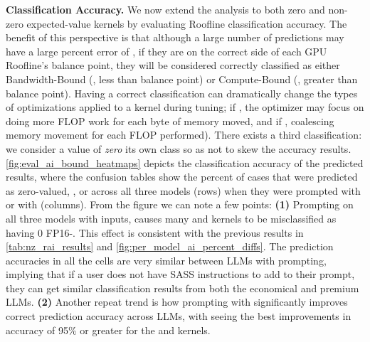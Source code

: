 
\textbf{\rai Classification Accuracy.}
We now extend the analysis to both zero and non-zero expected-value \rai kernels by evaluating Roofline classification accuracy.
The benefit of this perspective is that although a large number of \rai predictions may have a large percent error of \pmfifty, if they are on the correct side of each GPU Roofline's balance point, they will be considered correctly classified as either Bandwidth-Bound (\bandbound, less than balance point) or Compute-Bound (\compbound, greater than balance point).
Having a correct classification can dramatically change the types of optimizations applied to a kernel during tuning; if \compbound, the optimizer may focus on doing more FLOP work for each byte of memory moved, and if \bandbound, coalescing memory movement for each FLOP performed).
There exists a third \rai classification: we consider a \rai value of \textit{zero} its own class so as not to skew the \bandbound accuracy results.
\autoref{fig:eval_ai_bound_heatmaps} depicts the classification accuracy of the predicted \rai results, where the confusion tables show the percent of cases that were predicted as zero-valued, \bandbound, or \compbound across all three models (rows) when they were prompted with \sourceonly or with \sourceSASS (columns). 
From the figure we can note a few points:
\textbf{(1)} Prompting on all three models with \sourceonly inputs, causes many \bandbound and \compbound kernels to be misclassified as having 0 FP16-\rai. 
This effect is consistent with the previous results in \autoref{tab:nz_rai_results} and \autoref{fig:per_model_ai_percent_diffs}.
The prediction accuracies in all the cells are very similar between LLMs with \sourceonly prompting, implying that if a user does not have SASS instructions to add to their prompt, they can get similar \rai classification results from both the economical and premium LLMs.
\textbf{(2)} Another repeat trend is how prompting with \sourceSASS significantly improves correct prediction accuracy across LLMs, with \opus seeing the best improvements in accuracy of 95\% or greater for the \compbound and \bandbound kernels.

